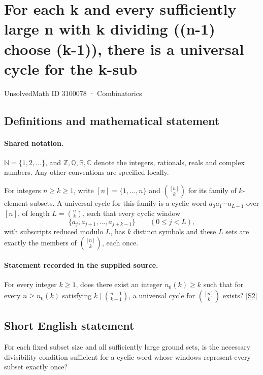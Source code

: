 \documentclass[11pt]{article}
\newcommand{\sref}[2]{\hyperlink{source:#1:#2}{[S#2]}}
\begin{document}
\setcounter{section}{3100077}
\section{For each k and every sufficiently large n with k dividing ((n-1) choose (k-1)), there is a universal cycle for the k-sub}\label{3100078}
{\small\sffamily UnsolvedMath ID 3100078 · Combinatorics}
\subsection{Definitions and mathematical statement}

\paragraph{Shared notation.}$\mathbb N=\{1,2,\ldots\}$, and $\mathbb Z,\mathbb Q,\mathbb R,\mathbb C$ denote the integers, rationals, reals and complex numbers. Any other conventions are specified locally.


For integers $n\ge k\ge1$, write $[n]=\{1,\ldots,n\}$ and $\binom{[n]}k$ for its family of $k$-element subsets. A universal cycle for this family is a cyclic word $a_0a_1\cdots a_{L-1}$ over $[n]$, of length $L=\binom nk$, such that every cyclic window
\[\{a_j,a_{j+1},\ldots,a_{j+k-1}\}\qquad(0\le j<L),\]
with subscripts reduced modulo $L$, has $k$ distinct symbols and these $L$ sets are exactly the members of $\binom{[n]}k$, each once.

\paragraph{Statement recorded in the supplied source.}
For every integer $k\ge1$, does there exist an integer $n_0(k)\ge k$ such that for every $n\ge n_0(k)$ satisfying $k\mid\binom{n-1}{k-1}$, a universal cycle for $\binom{[n]}k$ exists? \sref{3100078}{2}

\subsection{Short English statement}
For each fixed subset size and all sufficiently large ground sets, is the necessary divisibility condition sufficient for a cyclic word whose windows represent every subset exactly once?
\end{document}
